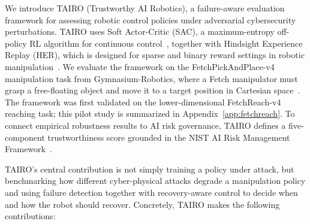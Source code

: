 \documentclass[conference]{IEEEtran}
\begin{document}
We introduce TAIRO (Trustworthy AI Robotics), a failure-aware evaluation framework for
assessing robotic control policies under adversarial cybersecurity perturbations. TAIRO
uses Soft Actor-Critic (SAC), a maximum-entropy off-policy RL algorithm for continuous
control~\cite{haarnoja2018soft}, together with Hindsight Experience Replay (HER), which
is designed for sparse and binary reward settings in robotic manipulation~\cite{andrychowicz2017hindsight}.
We evaluate the framework on the FetchPickAndPlace-v4 manipulation task from
Gymnasium-Robotics, where a Fetch manipulator must grasp a free-floating object and move
it to a target position in Cartesian space~\cite{gymnasiumrobotics2024,fetchreachdoc}.
The framework was first validated on the lower-dimensional FetchReach-v4 reaching task;
this pilot study is summarized in Appendix~\ref{app:fetchreach}. To connect empirical
robustness results to AI risk governance, TAIRO defines a five-component trustworthiness
score grounded in the NIST AI Risk Management Framework~\cite{nist2023airmf}.

TAIRO's central contribution is not simply training a policy under attack, but
benchmarking how different cyber-physical attacks degrade a manipulation policy and
using failure detection together with recovery-aware control to decide when and how
the robot should recover. Concretely, TAIRO makes the following contributions:
\end{document}
